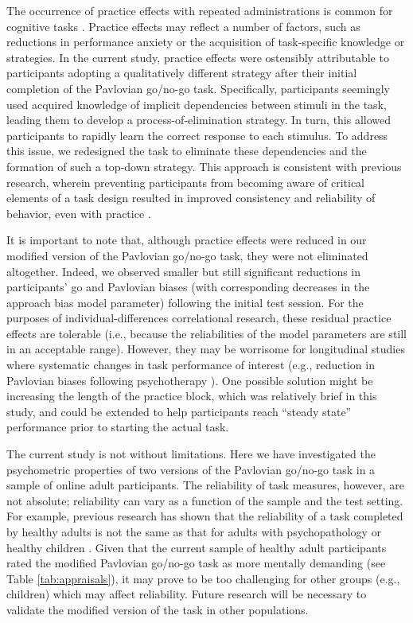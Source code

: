 \documentclass[a4paper,12pt]{article}
\begin{document}
\begin{refsection}[main]
The occurrence of practice effects with repeated administrations is common for cognitive tasks \cite{hausknecht2007retesting, scharfen2018retest}. Practice effects may reflect a number of factors, such as reductions in performance anxiety or the acquisition of task-specific knowledge or strategies. In the current study, practice effects were ostensibly attributable to participants adopting a qualitatively different strategy after their initial completion of the Pavlovian go/no-go task. Specifically, participants seemingly used acquired knowledge of implicit dependencies between stimuli in the task, leading them to develop a process-of-elimination strategy. In turn, this allowed participants to rapidly learn the correct response to each stimulus. To address this issue, we redesigned the task to eliminate these dependencies and the formation of such a top-down strategy. This approach is consistent with previous research, wherein preventing participants from becoming aware of critical elements of a task design resulted in improved consistency and reliability of behavior, even with practice \cite{mclean2018towards}. 

It is important to note that, although practice effects were reduced in our modified version of the Pavlovian go/no-go task, they were not eliminated altogether. Indeed, we observed smaller but still significant reductions in participants' go and Pavlovian biases (with corresponding decreases in the approach bias model parameter) following the initial test session. For the purposes of individual-differences correlational research, these residual practice effects are tolerable (i.e., because the reliabilities of the model parameters are still in an acceptable range). However, they may be worrisome for longitudinal studies where systematic changes in task performance of interest (e.g., reduction in Pavlovian biases following psychotherapy \cite{geurts2022aversive}). One possible solution might be increasing the length of the practice block, which was relatively brief in this study, and could be extended to help participants reach ``steady state'' performance prior to starting the actual task.

The current study is not without limitations. Here we have investigated the psychometric properties of two versions of the Pavlovian go/no-go task in a sample of online adult participants. The reliability of task measures, however, are not absolute; reliability can vary as a function of the sample and the test setting. For example, previous research has shown that the reliability of a task completed by healthy adults is not the same as that for adults with psychopathology \cite{cooper2017role} or healthy children \cite{arnon2020current}. Given that the current sample of healthy adult participants rated the modified Pavlovian go/no-go task as more mentally demanding (see Table \ref{tab:appraisals}), it may prove to be too challenging for other groups (e.g., children) which may affect reliability. Future research will be necessary to validate the modified version of the task in other populations. 


\end{refsection}
\end{document}
